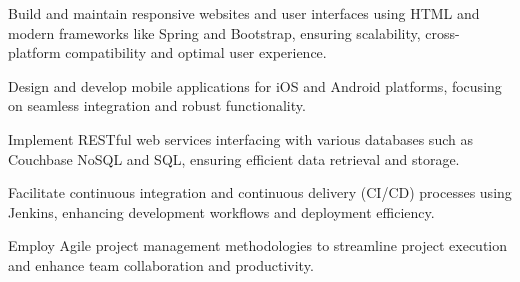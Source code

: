 \begin{tightemize}
    \item Build and maintain responsive websites and user interfaces using HTML and modern frameworks like Spring and Bootstrap, ensuring scalability, cross-platform compatibility and optimal user experience.
    \item Design and develop mobile applications for iOS and Android platforms, focusing on seamless integration and robust functionality.
    \item Implement RESTful web services interfacing with various databases such as Couchbase NoSQL and SQL, ensuring efficient data retrieval and storage.
    \item Facilitate continuous integration and continuous delivery (CI/CD) processes using Jenkins, enhancing development workflows and deployment efficiency.
    \item Employ Agile project management methodologies to streamline project execution and enhance team collaboration and productivity.
\end{tightemize}